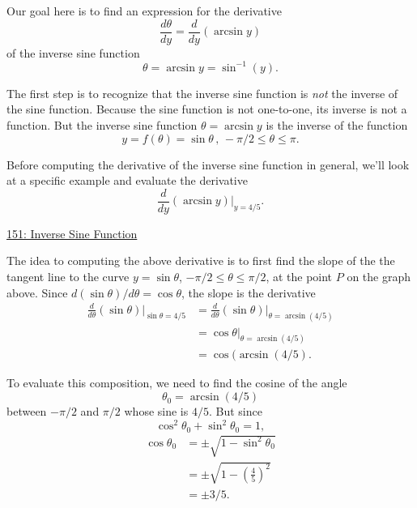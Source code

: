 \documentclass{ximera}
\begin{document}
Our goal here is to find an expression for the derivative
\[
       \frac{d\theta}{dy} = \frac{d}{dy} \left(   \arcsin y \right)
\]
of the inverse sine function
\[
       \theta = \arcsin y = \sin^{-1}(y) .
\]

The first step is to recognize that the inverse sine function is \emph{not} the inverse of the sine function. Because the sine function is not one-to-one, its inverse is not a function. But the inverse sine function $\theta = \arcsin y$ is the inverse of the function
\[
  y = f(\theta) = \sin\theta \, , \, -\pi/2 \leq \theta \leq \pi.
\]

\begin{example} \label{ExLKDFrsfD}
Before computing the derivative of the inverse sine function in general, we'll look at a specific example and evaluate the derivative
\[
   \frac{d}{dy} \left(  \arcsin y \right) \Big|_{y=4/5} .
\]

\begin{onlineOnly}
    \begin{center}
\end{center}
\end{onlineOnly}

\href{https://www.desmos.com/calculator/alp2mnxqhc}{151: Inverse Sine Function}

The idea to computing the above derivative is to first find the slope of the the tangent line to the curve $y=\sin\theta$, $-\pi/2 \leq \theta \leq \pi/2$, at the point $P$ on the graph above. Since $d(\sin\theta)/d\theta = \cos\theta$, the slope is the derivative
\begin{align*}
    \frac{d}{d\theta} \left(\sin\theta \right) \Big|_{\sin\theta = 4/5} &=  \frac{d}{d\theta} \left(\sin\theta \right) \Big|_{\theta = \arcsin(4/5)}  \\
                         &= \cos\theta        \Big|_{\theta = \arcsin(4/5)}  \\                                                       
 & = \cos (\arcsin(4/5).
\end{align*}

To evaluate this composition, we need to find the cosine of the angle 
\[
    \theta_0 = \arcsin(4/5)
\]
between $-\pi/2$ and $\pi/2$ whose sine is $4/5$. But since 
\[
  \cos^2\theta_0 + \sin^2\theta_0 = 1 ,
\] 
\begin{align*}
  \cos\theta_0 &= \pm \sqrt{1-\sin^2\theta_0} \\
                      &= \pm \sqrt{1-\left(\frac{4}{5}\right)^2} \\
                      &= \pm 3/5 .
\end{align*}


\end{example}
\end{document}
